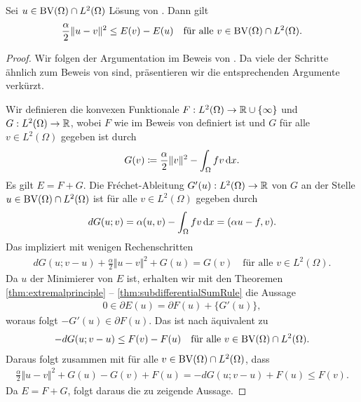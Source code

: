 \begin{theorem}
  \label{thm:convexity}
  Sei $u\in\textup{BV}(\Omega)\cap L^2(\Omega)$ Lösung von 
  .
  Dann gilt 
  \begin{align*}
    \frac{\alpha}{2}\Vert u-v\Vert^2 \leq E(v)-E(u)\quad
    \text{für alle } v\in\textup{BV}(\Omega)\cap L^2(\Omega).
  \end{align*}
\end{theorem}

\begin{proof}
  Wir folgen der Argumentation im Beweis von \cite[S. 309, Lemma 10.2]{Bar15}.
  Da viele der Schritte ähnlich zum Beweis von 
  sind, präsentieren wir die entsprechenden Argumente verkürzt.

  Wir definieren die konvexen Funktionale
  $F:L^2(\Omega)\to \mathbb{R}\cup\{\infty\}$ und $G:L^2(\Omega)\to \mathbb{R}$, wobei 
  $F$ wie im Beweis von  definiert ist und $G$
  für alle $v\in L^2(\Omega)$ gegeben ist durch 
  \begin{align*}
    G(v)\coloneqq \frac{\alpha}{2}\Vert v\Vert^2 - \int_\Omega f v\,\mathrm{d}x.
  \end{align*}
  Es gilt $E = F+G$.
  Die Fr\'echet-Ableitung $G'(u): L^2(\Omega)\to\mathbb{R}$ von $G$ an der Stelle
  $u\in \textup{BV}(\Omega)\cap L^2(\Omega)$ ist für alle $v\in L^2(\Omega)$ gegeben
  durch
  \begin{align*}
    dG(u;v) = \alpha (u,v) - \int_\Omega f v\,\mathrm{d}x 
    = (\alpha u-f ,v).
  \end{align*}
  Das impliziert mit wenigen Rechenschritten
  \begin{align}\label{eq:strongConvexityG}
    dG(u;v-u) +\frac{\alpha}{2}\Vert u-v\Vert^2+G(u) 
    =
    G(v)
    \quad\text{für alle } v\in L^2(\Omega).
  \end{align}
  Da $u$ der Minimierer von $E$ ist, erhalten wir mit den Theoremen
  \ref{thm:extremalprinciple} -- \ref{thm:subdifferentialSumRule} die Aussage
  \begin{align*}
    0\in\partial E(u) = \partial F(u)+\{G'(u)\},
  \end{align*}
  woraus folgt 
  $ -G'(u)\in\partial F(u).$
  Das ist nach  äquivalent zu
  \begin{align*}
    -dG(u;v-u)\leq F(v)-F(u)\quad\text{für alle }v\in\textup{BV}(\Omega)\cap
    L^2(\Omega).
  \end{align*}
  Daraus folgt zusammen mit  für alle $v\in
  \textup{BV}(\Omega)\cap L^2(\Omega)$, dass
  \begin{align*}
    \frac{\alpha}{2}\Vert u-v\Vert^2+G(u)-G(v)+F(u)
    = -dG(u;v-u)+F(u)\leq F(v).
  \end{align*}
  Da $E=F+G$, folgt daraus die zu zeigende Aussage.
\end{proof}

